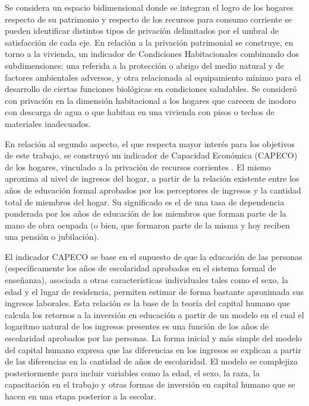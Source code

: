 Se considera un espacio bidimensional donde se integran el logro de los hogares respecto de su patrimonio y respecto de los recursos para consumo corriente se pueden identificar distintos tipos de privación delimitados por el umbral de satisfacción de cada eje. En relación a la privación patrimonial se construye, en torno a la vivienda, un indicador de Condiciones Habitacionales combinando dos subdimensiones: una referida a la protección o abrigo del medio natural y de factores ambientales adversos, y otra relacionada al equipamiento mínimo para el desarrollo de ciertas funciones biológicas en condiciones saludables. Se consideró con privación en la dimensión habitacional a los hogares que carecen de inodoro con descarga de agua o que habitan en una vivienda con pisos o techos de materiales inadecuados.

En relación al segundo aspecto, el que respecta mayor interés para los objetivos de este trabajo, se construyó un indicador de Capacidad Económica (CAPECO) de los hogares, vinculado a la privación de recursos corrientes \cite{alvarez2002}. El mismo aproxima al nivel de ingresos del hogar, a partir de la relación existente entre los años de educación formal aprobados por los perceptores de ingresos y la cantidad total de miembros del hogar. Su significado es el de una tasa de dependencia ponderada por los años de educación de los miembros que forman parte de la mano de obra ocupada (o bien, que formaron parte de la misma y hoy reciben una pensión o jubilación). 

El indicador CAPECO se base en el supuesto de que la educación de las personas (específicamente los años de escolaridad aprobados en el sistema formal de enseñanza), asociada a otras características individuales tales como el sexo, la edad y el lugar de residencia, permiten estimar de forma bastante aproximada sus ingresos laborales. Esta relación es la base de la teoría del capital humano \cite{mincer,beckar,schultz1961,schultz1962} que calcula los retornos a la inversión en educación a partir de un modelo en el cual el logaritmo natural de los ingresos presentes es una función de los años de escolaridad aprobados por las personas. La forma inicial y más simple del modelo del capital humano expresa que las diferencias en los ingresos se explican a partir de las diferencias en la cantidad de años de escolaridad. El modelo se complejiza posteriormente para incluir variables como la edad, el sexo, la raza, la capacitación en el trabajo y otras formas de inversión en capital humano que se hacen en una etapa posterior a la escolar.

